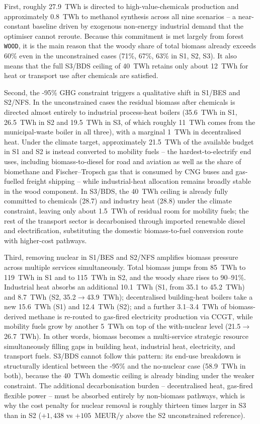 \documentclass{article}
\begin{document}
First, roughly 27.9~TWh is directed to high-value-chemicals production and approximately 0.8~TWh to methanol synthesis across all nine scenarios -- a near-constant baseline driven by exogenous non-energy industrial demand that the optimiser cannot reroute. Because this commitment is met largely from forest \texttt{WOOD}, it is the main reason that the woody share of total biomass already exceeds 60\% even in the unconstrained cases (71\%, 67\%, 63\% in S1, S2, S3). It also means that the full S3/BDS ceiling of 40~TWh retains only about 12~TWh for heat or transport use after chemicals are satisfied.

Second, the -95\% GHG constraint triggers a qualitative shift in S1/BES and S2/NFS. In the unconstrained cases the residual biomass after chemicals is directed almost entirely to industrial process-heat boilers (35.6~TWh in S1, 26.5~TWh in S2 and 19.5~TWh in S3, of which roughly 11~TWh comes from the municipal-waste boiler in all three), with a marginal 1~TWh in decentralised heat. Under the climate target, approximately 21.5~TWh of the available budget in S1 and S2 is instead converted to mobility fuels -- the hardest-to-electrify end uses, including biomass-to-diesel for road and aviation as well as the share of biomethane and Fischer--Tropsch gas that is consumed by CNG buses and gas-fuelled freight shipping -- while industrial-heat allocation remains broadly stable in the wood component. In S3/BDS, the 40~TWh ceiling is already fully committed to chemicals (28.7) and industry heat (28.8) under the climate constraint, leaving only about 1.5~TWh of residual room for mobility fuels; the rest of the transport sector is decarbonised through imported renewable diesel and electrification, substituting the domestic biomass-to-fuel conversion route with higher-cost pathways.

Third, removing nuclear in S1/BES and S2/NFS amplifies biomass pressure across multiple services simultaneously. Total biomass jumps from 85~TWh to 119~TWh in S1 and to 115~TWh in S2, and the woody share rises to 90--91\%. Industrial heat absorbs an additional 10.1~TWh (S1, from 35.1 to 45.2~TWh) and 8.7~TWh (S2, 35.2$\rightarrow$43.9~TWh); decentralised building-heat boilers take a new 15.6~TWh (S1) and 12.4~TWh (S2); and a further 3.1--3.4~TWh of biomass-derived methane is re-routed to gas-fired electricity production via CCGT, while mobility fuels grow by another 5~TWh on top of the with-nuclear level (21.5$\rightarrow$26.7~TWh). In other words, biomass becomes a multi-service strategic resource simultaneously filling gaps in building heat, industrial heat, electricity, and transport fuels. S3/BDS cannot follow this pattern: its end-use breakdown is structurally identical between the -95\% and the no-nuclear case (58.9~TWh in both), because the 40~TWh domestic ceiling is already binding under the weaker constraint. The additional decarbonisation burden -- decentralised heat, gas-fired flexible power -- must be absorbed entirely by non-biomass pathways, which is why the cost penalty for nuclear removal is roughly thirteen times larger in S3 than in S2 ($+1{,}438$ vs $+105$~MEUR/y above the S2 unconstrained reference).
\end{document}
